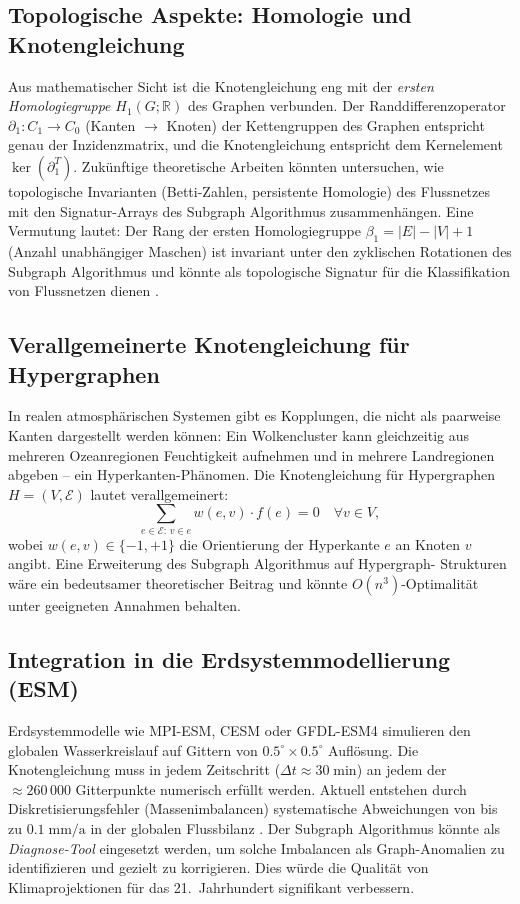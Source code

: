 ﻿\documentclass[a4paper,12pt]{article}
\theoremstyle{definition}
\begin{document}
\subsection{Topologische Aspekte: Homologie und Knotengleichung}

Aus mathematischer Sicht ist die Knotengleichung eng mit der
\emph{ersten Homologiegruppe} $H_1(G; \mathbb{R})$ des Graphen verbunden.
Der Randdifferenzoperator $\partial_1: C_1 \to C_0$ (Kanten $\to$ Knoten)
der Kettengruppen des Graphen entspricht genau der Inzidenzmatrix, und
die Knotengleichung entspricht dem Kernelement $\ker(\partial_1^T)$.
Zukünftige theoretische Arbeiten könnten untersuchen, wie topologische
Invarianten (Betti-Zahlen, persistente Homologie) des Flussnetzes mit
den Signatur-Arrays des Subgraph Algorithmus zusammenhängen. Eine
Vermutung lautet: Der Rang der ersten Homologiegruppe $\beta_1 = |E| - |V| + 1$
(Anzahl unabhängiger Maschen) ist invariant unter den zyklischen
Rotationen des Subgraph Algorithmus und könnte als topologische
Signatur für die Klassifikation von Flussnetzen dienen \cite{edelsbrunner2010}.

\subsection{Verallgemeinerte Knotengleichung für Hypergraphen}

In realen atmosphärischen Systemen gibt es Kopplungen, die nicht als
paarweise Kanten dargestellt werden können: Ein Wolkencluster kann
gleichzeitig aus mehreren Ozeanregionen Feuchtigkeit aufnehmen
und in mehrere Landregionen abgeben -- ein Hyperkanten-Phänomen.
Die Knotengleichung für Hypergraphen $H = (V, \mathcal{E})$ lautet
verallgemeinert:
\[
  \sum_{e \in \mathcal{E}:\, v \in e} w(e,v) \cdot f(e) = 0 \quad \forall v \in V,
\]
wobei $w(e,v) \in \{-1, +1\}$ die Orientierung der Hyperkante $e$ an
Knoten $v$ angibt. Eine Erweiterung des Subgraph Algorithmus auf Hypergraph-
Strukturen wäre ein bedeutsamer theoretischer Beitrag und könnte
$O(n^3)$-Optimalität unter geeigneten Annahmen behalten.

\subsection{Integration in die Erdsystemmodellierung (ESM)}

Erdsystemmodelle wie MPI-ESM, CESM oder GFDL-ESM4 simulieren den globalen
Wasserkreislauf auf Gittern von $0.5^\circ \times 0.5^\circ$ Auflösung.
Die Knotengleichung muss in jedem Zeitschritt ($\Delta t \approx 30\;\text{min}$)
an jedem der $\approx 260\,000$ Gitterpunkte numerisch erfüllt werden.
Aktuell entstehen durch Diskretisierungsfehler (Massenimbalancen)
systematische Abweichungen von bis zu $0.1\;\text{mm}/\text{a}$ in der
globalen Flussbilanz \cite{hersbach2020}. Der Subgraph Algorithmus könnte
als \emph{Diagnose-Tool} eingesetzt werden, um solche Imbalancen als
Graph-Anomalien zu identifizieren und gezielt zu korrigieren. Dies würde
die Qualität von Klimaprojektionen für das 21.\ Jahrhundert signifikant
verbessern.
\end{document}
